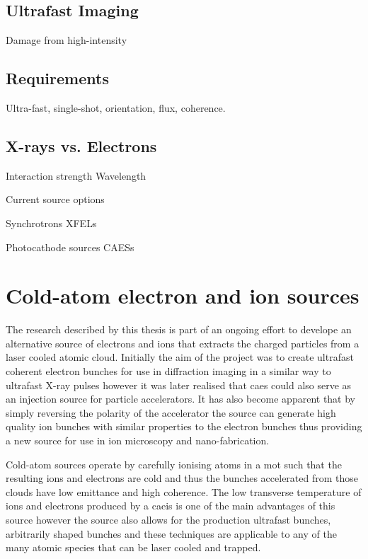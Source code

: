 \subsection{Ultrafast Imaging}

Damage from high-intensity 

\subsection{Requirements}

Ultra-fast, single-shot, orientation, flux, coherence.

\subsection{X-rays vs. Electrons}



Interaction strength
Wavelength

Current source options

Synchrotrons
XFELs

Photocathode sources
CAESs

\section{Cold-atom electron and ion sources}

The research described by this thesis is part of an ongoing effort to develope an alternative source of electrons and ions that extracts the charged particles from a laser cooled atomic cloud.
Initially the aim of the project was to create ultrafast coherent electron bunches for use in diffraction imaging in a similar way to ultrafast X-ray pulses however it was later realised that \gls{caes} could also serve as an injection source for particle accelerators.
It has also become apparent that by simply reversing the polarity of the accelerator the source can generate high quality ion bunches with similar properties to the electron bunches thus providing a new source for use in ion microscopy and nano-fabrication.

Cold-atom sources operate by carefully ionising atoms in a \gls{mot} such that the resulting ions and electrons are cold and thus the bunches accelerated from those clouds have low emittance and high coherence.
The low transverse temperature of ions and electrons produced by a \gls{caeis} is one of the main advantages of this source however the source also allows for the production ultrafast bunches, arbitrarily shaped bunches and these techniques are applicable to any of the many atomic species that can be laser cooled and trapped.

